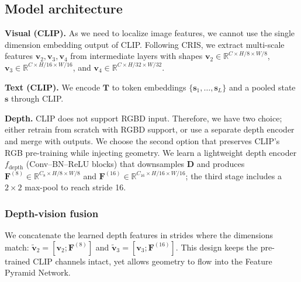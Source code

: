 \subsection{Model architecture} 

\textbf{Visual (CLIP).} As we need to localize image features, we cannot use the single dimension embedding output of CLIP. Following CRIS, we extract multi-scale features $\mathbf{v}_2,\mathbf{v}_3,\mathbf{v}_4$ from intermediate layers with shapes $\mathbf{v}_2\!\in\!\mathbb{R}^{C\times H/8\times W/8}$, $\mathbf{v}_3\!\in\!\mathbb{R}^{C\times H/16\times W/16}$, and $\mathbf{v}_4\!\in\!\mathbb{R}^{C\times H/32\times W/32}$.

\vspace{0.5em}


\noindent\textbf{Text (CLIP).} We encode $\mathbf{T}$ to token embeddings $\{\mathbf{s}_1,\dots,\mathbf{s}_L\}$ and a pooled state $\mathbf{s}$ through CLIP.

\vspace{0.5em}


\noindent\textbf{Depth.} CLIP does not support RGBD input. Therefore, we have two choice; either retrain from scratch with RGBD support, or use a separate depth encoder and merge with outputs. We choose the second option that preserves CLIP's RGB pre-training while injecting geometry.
We learn a lightweight depth encoder $f_{\text{depth}}$ (Conv–BN–ReLU blocks) that downsamples $\mathbf{D}$ and produces $\mathbf{F}^{(8)}\!\in\!\mathbb{R}^{C_8\times H/8\times W/8}$ and $\mathbf{F}^{(16)}\!\in\!\mathbb{R}^{C_{16}\times H/16\times W/16}$; the third stage includes a $2\!\times\!2$ max-pool to reach stride 16. 

\subsubsection{Depth-vision fusion}
We concatenate the learned depth features in strides where the dimensions match: $\tilde{\mathbf{v}}_2=[\mathbf{v}_2;\mathbf{F}^{(8)}]$ and $\tilde{\mathbf{v}}_3=[\mathbf{v}_3;\mathbf{F}^{(16)}]$. This design keeps the pre-trained CLIP channels intact, yet allows geometry to flow into the Feature Pyramid Network.

